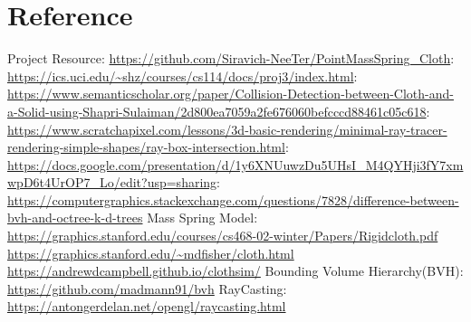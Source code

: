 \documentclass{article}
\begin{document}
\section*{Reference}
\justify
Project Resource: \url{https://github.com/Siravich-NeeTer/PointMassSpring_Cloth}\newline\newline
[Figure 2.1.1] :\\ \url{https://ics.uci.edu/~shz/courses/cs114/docs/proj3/index.html}\newline
[Figure 2.2.2.1] :\\ \url{https://www.semanticscholar.org/paper/Collision-Detection-between-Cloth-and-a-Solid-using-Shapri-Sulaiman/2d800ea7059a2fe676060befcccd88461c05c618}\newline
[Figure 2.2.2.2] :\\ \url{https://www.scratchapixel.com/lessons/3d-basic-rendering/minimal-ray-tracer-rendering-simple-shapes/ray-box-intersection.html}\newline
[Figure 3.1] :\\ \url{https://docs.google.com/presentation/d/1y6XNUuwzDu5UHsI_M4QYHji3fY7xmwpD6t4UrOP7_Lo/edit?usp=sharing}\newline
[Figure 4.1] :\\ \url{https://computergraphics.stackexchange.com/questions/7828/difference-between-bvh-and-octree-k-d-trees}\newline\newline
Mass Spring Model:\\
\url{https://graphics.stanford.edu/courses/cs468-02-winter/Papers/Rigidcloth.pdf}\newline
\url{https://graphics.stanford.edu/~mdfisher/cloth.html}\newline
\url{https://andrewdcampbell.github.io/clothsim/}\newline\newline
Bounding Volume Hierarchy(BVH):\\
\url{https://github.com/madmann91/bvh}\newline\newline
RayCasting:\\
\url{https://antongerdelan.net/opengl/raycasting.html}\newline
\end{document}
